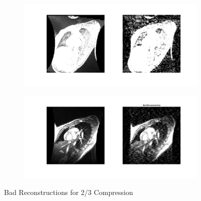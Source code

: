 \documentclass[a4paper]{article}
\begin{document}
\begin{figure}[h]
\begin{subfigure}{.5\textwidth}
  \centering
  \includegraphics[width = 6in]{bad11.jpg}
  \label{fig:sfig1}
\end{subfigure}%

\begin{subfigure}{.5\textwidth}
  \centering
  \includegraphics[width = 6in]{bad12.jpg}
  \label{fig:sfig2}
\end{subfigure}
\caption{Bad Reconstructions for 2/3 Compression}
\end{figure}
\end{document}
